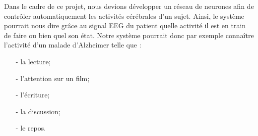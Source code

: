 	   Dans le cadre de ce projet, nous devions développer un réseau de neurones afin de contrôler automatiquement les activités cérébrales d'un sujet. Ainsi, le système pourrait nous dire grâce au signal EEG du patient quelle activité il est en train de faire ou bien quel son état. Notre système pourrait donc par exemple connaître l'activité d'un malade d'Alzheimer telle que : 
	   \begin{itemize}
	   	\item[-] la lecture;
		\item[-] l'attention sur un film;
		\item[-] l'écriture;
		\item[-] la discussion;
		\item[-] le repos.
	   \end{itemize}
	
	
	
	

